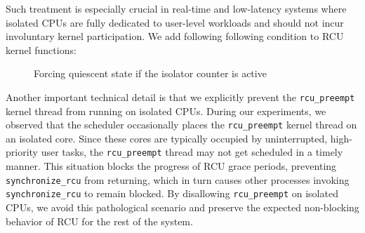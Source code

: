 \documentclass[letterpaper]{article}
\begin{document}
Such treatment is especially crucial in real-time and low-latency systems where isolated CPUs are
fully dedicated to user-level workloads and should not incur involuntary kernel participation.
We add following following condition to RCU kernel functions:


\begin{figure}[h]
\centering
{}
\caption{Forcing quiescent state if the isolator counter is active}
\end{figure}




Another important technical detail is that we explicitly prevent the \texttt{rcu\_preempt} kernel 
thread from running on isolated CPUs. During our experiments, we observed that the scheduler 
occasionally places the \texttt{rcu\_preempt} kernel thread on an isolated core. Since these cores 
are typically occupied by uninterrupted, high-priority user tasks, the \texttt{rcu\_preempt} 
thread may not get scheduled in a timely manner. This situation blocks the progress of RCU grace 
periods, preventing \texttt{synchronize\_rcu} from returning, which in turn causes other processes 
invoking \texttt{synchronize\_rcu} to remain blocked. By disallowing \texttt{rcu\_preempt} on 
isolated CPUs, we avoid this pathological scenario and preserve the expected non-blocking behavior 
of RCU for the rest of the system.  
\end{document}
